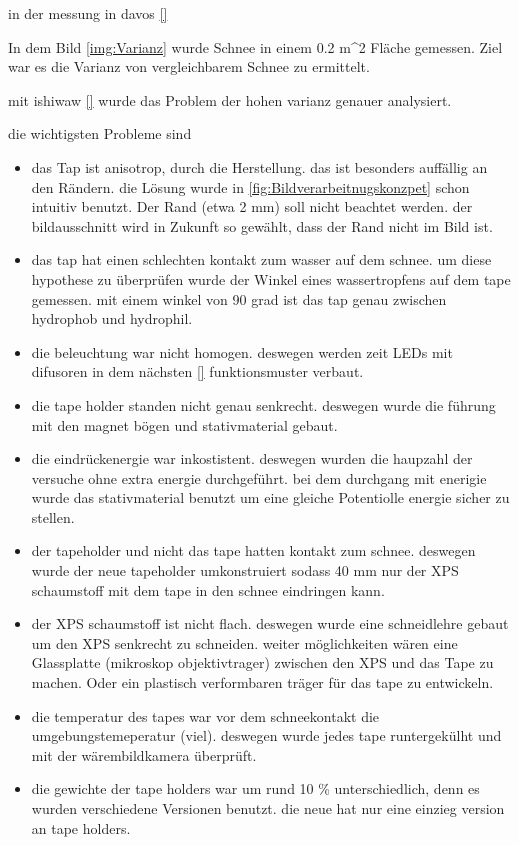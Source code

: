 in der messung in davos \ref{}

In dem Bild \ref{img:Varianz} wurde Schnee in einem 0.2 m^2 Fläche gemessen. Ziel war es die Varianz von vergleichbarem Schnee zu ermittelt.

mit ishiwaw \ref{} wurde das Problem der hohen varianz genauer analysiert.

die wichtigsten Probleme sind
\begin{itemize}
\item das Tap ist anisotrop, durch die Herstellung. das ist besonders auffällig an den Rändern. die Lösung wurde in \ref{fig:Bildverarbeitnugskonzpet} schon intuitiv benutzt. Der Rand (etwa 2 mm) soll nicht beachtet werden. der bildausschnitt wird in Zukunft so gewählt, dass der Rand nicht im Bild ist.
\item das tap hat einen schlechten kontakt zum wasser auf dem schnee. um diese hypothese zu überprüfen wurde der Winkel eines wassertropfens auf dem tape gemessen. mit einem winkel von 90 grad ist das tap genau zwischen hydrophob und hydrophil.
\item die beleuchtung war nicht homogen. deswegen werden zeit LEDs mit difusoren in dem nächsten \ref{} funktionsmuster verbaut.
\item die tape holder standen nicht genau senkrecht. deswegen wurde die führung mit den magnet bögen und stativmaterial gebaut.
\item die eindrückenergie war inkostistent. deswegen wurden die haupzahl der versuche ohne extra energie durchgeführt. bei dem durchgang mit enerigie wurde das stativmaterial benutzt um eine gleiche Potentiolle energie sicher zu stellen.
\item der tapeholder und nicht das tape hatten kontakt zum schnee. deswegen wurde der neue tapeholder umkonstruiert sodass 40 mm nur der XPS schaumstoff mit dem tape in den schnee eindringen kann.
\item der XPS schaumstoff ist nicht flach. deswegen wurde eine schneidlehre gebaut um den XPS senkrecht  zu schneiden. weiter möglichkeiten wären eine Glassplatte (mikroskop objektivtrager) zwischen den XPS und das Tape zu machen. Oder ein plastisch verformbaren träger für das tape zu entwickeln.
\item die temperatur des tapes war vor dem schneekontakt die umgebungstemeperatur (viel). deswegen wurde jedes tape runtergekülht und mit der wärembildkamera überprüft.
\item die gewichte der tape holders war um rund 10 \% unterschiedlich, denn es wurden verschiedene Versionen benutzt. die neue hat nur eine einzieg version an tape holders.

  
\end{itemize}

